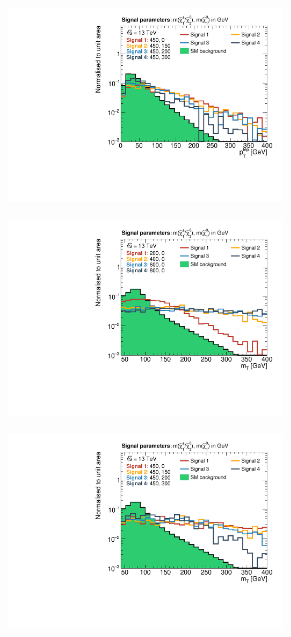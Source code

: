 \begin{figure}
\begin{subfigure}[b]{0.5\linewidth}
	\end{subfigure}\hfill
	\begin{subfigure}[b]{0.5\linewidth}
		\centering\includegraphics[width=0.8\textwidth]{mass_diff/lep1Pt}
	\end{subfigure}\hfill
	\par\medskip
	\begin{subfigure}[b]{0.5\linewidth}
		\centering\includegraphics[width=0.8\textwidth]{high_mass/mt}
	\end{subfigure}\hfill
	\begin{subfigure}[b]{0.5\linewidth}
		\centering\includegraphics[width=0.8\textwidth]{mass_diff/mt}

\end{subfigure}
\end{figure}
